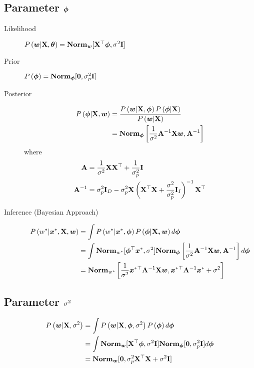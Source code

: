 \subsection*{Parameter $\vec{\ph}$}
\begin{description}
	\item[Likelihood] $\P{\vec{w}|\mat{X},\vec{\th}}=\Norm_{\vec{w}}[\mat{X}\T\vec{\ph},\si^2\mat{I}]$
	\item[Prior] $\P{\vec{\ph}}=\Norm_{\vec{\ph}}[\vec{0},\si_p^2\mat{I}]$
	\item[Posterior] 
	\begin{align*}
	\P{\vec{\ph}|\mat{X},\vec{w}}&=\frac{\P{\vec{w}|\mat{X},\vec{\ph}}\P{\vec{\ph}|\mat{X}}}{\P{\vec{w}|\mat{X}}} \\
	&=\Norm_{\vec{\ph}}\left[\frac{1}{\si^2}\mat{A}\inv\mat{X}\vec{w},\mat{A}\inv\right]
	\end{align*}
	where
	\begin{align*}
	\mat{A}&=\frac{1}{\si^2}\mat{X}\mat{X}\T+\frac{1}{\si_p^2}\mat{I} \\
	\mat{A}\inv&=\si_p^2\mat{I}_D-\si_p^2\mat{X}\left(\mat{X}\T\mat{X}+\frac{\si^2}{\si_p^2}\mat{I}_I\right)\inv\mat{X}\T
	\end{align*}
	\item[Inference (Bayesian Approach)]
	\begin{align*}
	\P{w^*|\vec{x}^*,\mat{X},\vec{w}}&=\int\P{w^*|\vec{x}^*,\vec{\ph}}\P{\vec{\ph|\mat{X},\vec{w}}}d\vec{\ph} \\
	&=\int\Norm_{w^*}[\vec{\ph}\T\vec{x}^*,\si^2]\Norm_{\vec{\ph}}\left[\frac{1}{\si^2}\mat{A}\inv\mat{X}\vec{w},\mat{A}\inv\right]d\vec{\ph} \\
	&=\Norm_{w^*}\left[\frac{1}{\si^2}\vec{x}^*\T\mat{A}\inv\mat{X}\vec{w},\vec{x}^*\T\mat{A}\inv\vec{x}^*+\si^2\right]
	\end{align*}
\end{description}

\subsection*{Parameter $\si^2$}
\begin{align*}
\P{\vec{w}|\mat{X},\si^2}&=\int\P{\vec{w}|\mat{X},\vec{\ph},\si^2}\P{\vec{\ph}}d\vec{\ph} \\
&=\int\Norm_{\vec{w}}[\mat{X}\T\vec{\ph},\si^2\mat{I}]\Norm_{\vec{\ph}}[\vec{0},\si_p^2\mat{I}]d\vec{\ph} \\
&=\Norm_{\vec{w}}[\vec{0},\si_p^2\mat{X}\T\mat{X}+\si^2\mat{I}]
\end{align*}

